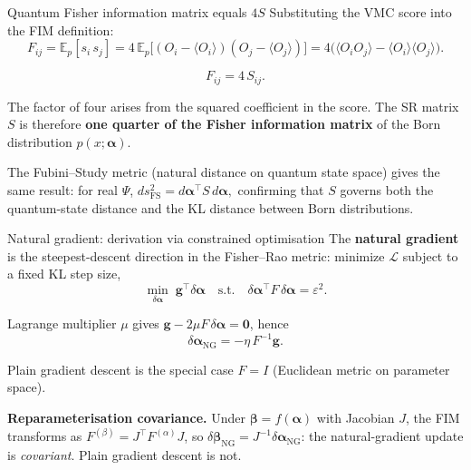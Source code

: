 \documentclass[aspectratio=169]{beamer}
\begin{document}
\begin{frame}{Quantum Fisher information matrix equals \(4S\)}
Substituting the VMC score into the FIM definition:
\[
F_{ij}
=\mathbb{E}_p[s_i\,s_j]
=4\,\mathbb{E}_p\bigl[(O_i-\langle O_i\rangle)(O_j-\langle O_j\rangle)\bigr]
=4\bigl(\langle O_iO_j\rangle-\langle O_i\rangle\langle O_j\rangle\bigr).
\]

\[
\boxed{F_{ij}=4\,S_{ij}.}
\]

The factor of four arises from the squared coefficient in the score.
The SR matrix \(S\) is therefore \textbf{one quarter of the Fisher
information matrix} of the Born distribution \(p(x;\bm{\alpha})\).

\medskip

The Fubini--Study metric (natural distance on quantum state space)
gives the same result: for real \(\Psi\),
\(
ds^2_{\mathrm{FS}}=d\bm{\alpha}^\top S\,d\bm{\alpha},
\)
confirming that \(S\) governs both the quantum-state distance and
the KL distance between Born distributions.
\end{frame}


\begin{frame}{Natural gradient: derivation via constrained optimisation}
The \textbf{natural gradient} is the steepest-descent direction
in the Fisher--Rao metric: minimize \(\mathcal{L}\) subject to a
fixed KL step size,
\[
\min_{\delta\bm{\alpha}}\;\bm{g}^\top\delta\bm{\alpha}
\quad\text{s.t.}\quad
\delta\bm{\alpha}^\top F\,\delta\bm{\alpha}=\varepsilon^2.
\]

Lagrange multiplier \(\mu\) gives
\(\bm{g}-2\mu F\,\delta\bm{\alpha}=\bm{0}\), hence
\[
\boxed{\delta\bm{\alpha}_{\mathrm{NG}}=-\eta\,F^{-1}\bm{g}.}
\]

Plain gradient descent is the special case \(F=I\)
(Euclidean metric on parameter space).

\medskip

\textbf{Reparameterisation covariance.}
Under \(\bm{\beta}=f(\bm{\alpha})\) with Jacobian \(J\),
the FIM transforms as \(F^{(\beta)}=J^\top F^{(\alpha)}J\),
so \(\delta\bm{\beta}_{\mathrm{NG}}=J^{-1}\delta\bm{\alpha}_{\mathrm{NG}}\):
the natural-gradient update is \emph{covariant}.
Plain gradient descent is not.
\end{frame}
\end{document}
